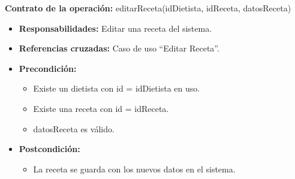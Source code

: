 \textbf{Contrato de la operación:} editarReceta(idDietista, idReceta, datosReceta)
\begin{itemize}
\item \textbf{Responsabilidades:} Editar una receta del sistema.
\item \textbf{Referencias cruzadas:} Caso de uso ``Editar Receta''.
\item \textbf{Precondición:}
\begin{itemize}
\item Existe un dietista con id = idDietista en uso.
\item Existe una receta con id = idReceta.
\item datosReceta es válido.
\end{itemize}
\item \textbf{Postcondición:}
\begin{itemize}
\item La receta se guarda con los nuevos datos en el sistema.
\end{itemize}
\end{itemize}

